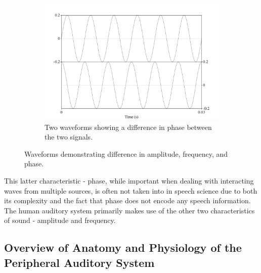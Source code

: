 \begin{figure}[h!]
\begin{center}
\begin{subfigure}{0.5\textwidth}
  \includegraphics[width=\textwidth]{figure/basic-sound-phase.png}
  \caption{Two waveforms showing a difference in phase between the two signals.}
  \label{fig:basic-sound-phase}
\end{subfigure}
\end{center}
\caption{Waveforms demonstrating difference in amplitude, frequency, and phase.}
\label{fig:basic-sound-wave}
\end{figure}

This latter characteristic - phase, while important when dealing with interacting waves from multiple sources, is often not taken into \DIFaddbegin {}\DIFaddend in speech science due to both its complexity and the fact that phase does not encode any speech information.  The human auditory system primarily makes use of the other two characteristics of sound - amplitude and frequency.

\subsection{Overview of Anatomy and Physiology of the Peripheral Auditory System}

